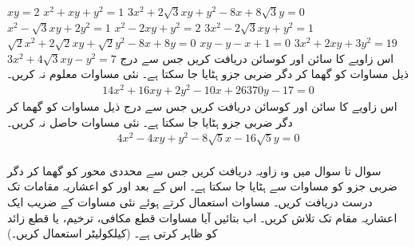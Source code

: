 $xy=2$
$x^2+xy+y^2=1$
$3x^2+2\sqrt{3}xy+y^2-8x+8\sqrt{3}y=0$
$x^2-\sqrt{3}xy+2y^2=1$
$x^2-2xy+y^2=2$
$3x^2-2\sqrt{3}xy+y^2=1$
$\sqrt{2}x^2+2\sqrt{2}xy+\sqrt{2}y^2-8x+8y=0$
$xy-y-x+1=0$
$3x^2+2xy+3y^2=19$
$3x^2+4\sqrt{3}xy-y^2=7$
اس زاویے  کا سائن اور کوسائن دریافت کریں جس سے درج ذیل مساوات کو گھما کر دگر ضربی جزو ہٹایا جا سکتا ہے۔ نئی مساوات معلوم نہ کریں۔
\begin{align*}
14x^2+16xy+2y^2-10x+26370y-17=0
\end{align*}
اس زاویے  کا سائن اور کوسائن دریافت کریں جس  سے درج ذیل مساوات کو گھما کر دگر ضربی جزو ہٹایا جا سکتا ہے۔ نئی مساوات حاصل نہ کریں۔
\begin{align*}
4x^2-4xy+y^2-8\sqrt{5}x-16\sqrt{5}y=0
\end{align*}
\\
سوال  تا سوال  میں وہ زاویہ  دریافت کریں جس  سے  محددی محور کو گھما کر  دگر ضربی جزو  کو مساوات سے ہٹایا جا سکتا ہے۔ اس کے بعد  اور  کو  اعشاریہ مقامات تک درست دریافت کریں۔ مساوات  استعمال کرتے ہوئے نئی مساوات کے  ضریب  ایک اعشاریہ  مقام  تک تلاش کریں۔ اب بتائیں آیا مساوات قطع مکافی، ترخیم،  یا قطع زائد کو ظاہر کرتی ہے۔ (کیلکولیٹر استعمال کریں۔)

